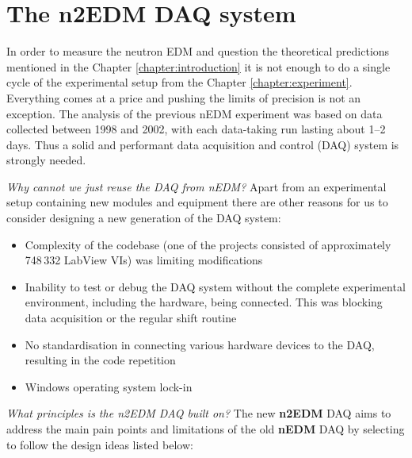 \chapter{The n2EDM DAQ system}
\label{chapter:daq}

In order to measure the neutron EDM and question the theoretical predictions mentioned in the Chapter \ref{chapter:introduction} it is not enough to do a single cycle of the experimental setup from the Chapter \ref{chapter:experiment}. Everything comes at a price and pushing the limits of precision is not an exception. The analysis \cite{Pendlebury2004} of the previous nEDM experiment was based on data collected between 1998 and 2002, with each data-taking run lasting about 1--2 days. Thus a solid and performant data acquisition and control (DAQ) system is strongly needed.

\textit{Why cannot we just reuse the DAQ from nEDM?} Apart from an experimental setup containing new modules and equipment there are \cite{Bison2018} other reasons for us to consider designing a new generation of the DAQ system:

\begin{itemize}
	\item Complexity of the codebase (one of the projects consisted of approximately 748\,332 LabView VIs) was limiting modifications
	\item Inability to test or debug the DAQ system without the complete experimental environment, including the hardware, being connected. This was blocking data acquisition or the regular shift routine
	\item No standardisation in connecting various hardware devices to the DAQ, resulting in the code repetition
	\item Windows operating system lock-in
\end{itemize}

\textit{What principles is the n2EDM DAQ built on?} The new \textbf{n2EDM} DAQ aims to address the main pain points and limitations of the old \textbf{nEDM} DAQ by selecting to follow the design ideas listed below:


